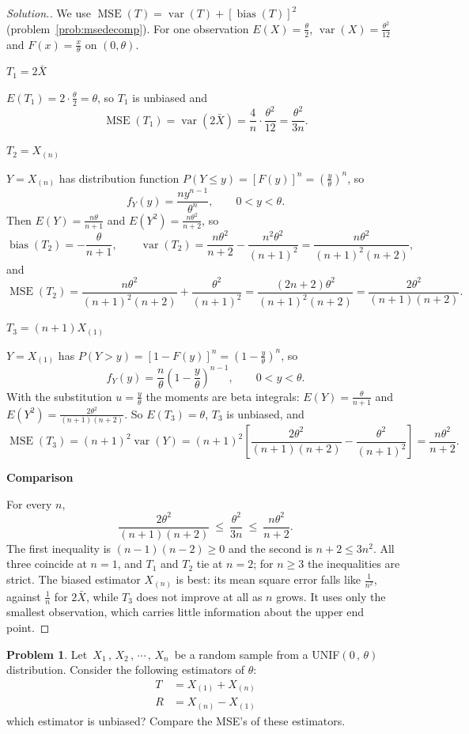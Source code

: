 \documentclass[12pt,a4paper]{report}
\theoremstyle{definition}
\newcommand{\subhead}[1]{%
  \par\medskip\noindent\textbf{#1}\par\nobreak\smallskip}
\DeclareMathOperator{\var}{var}
\DeclareMathOperator{\bias}{bias}
\DeclareMathOperator{\MSE}{MSE}
\newtheorem{problemx}{Problem}[section]
\newenvironment{problem}{\begin{problemx}}{\end{problemx}}
\newenvironment{solution}
  {\renewcommand{\qedsymbol}{}\begin{proof}[\textit{Solution}.]}
  {\end{proof}}
\begin{document}
\begin{solution}
We use $\MSE(T) = \var(T) + \left[\bias(T)\right]^2$ (problem~\ref{prob:msedecomp}).
For one observation $E(X) = \frac\theta2$, $\var(X) = \frac{\theta^2}{12}$ and
$F(x) = \frac x\theta$ on $(0, \theta)$.

\subhead{$T_1 = 2\bar X$}
$E(T_1) = 2\cdot\frac\theta2 = \theta$, so $T_1$ is unbiased and
\[\MSE(T_1) = \var(2\bar X) = \frac{4}{n}\cdot\frac{\theta^2}{12} = \frac{\theta^2}{3n} .\]

\subhead{$T_2 = X_{(n)}$}
$Y = X_{(n)}$ has distribution function $P(Y\le y) = \left[F(y)\right]^n =
\left(\frac y\theta\right)^n$, so
\[f_Y(y) = \frac{n y^{n-1}}{\theta^n},\qquad 0<y<\theta .\]
Then $E(Y) = \frac{n\theta}{n + 1}$ and $E(Y^2) = \frac{n\theta^2}{n + 2}$, so
\[\bias(T_2) = -\frac{\theta}{n + 1},\qquad
\var(T_2) = \frac{n\theta^2}{n + 2} - \frac{n^2\theta^2}{(n + 1)^2} = \frac{n\theta^2}{(n + 1)^2(n + 2)},\]
and
\[\MSE(T_2) = \frac{n\theta^2}{(n + 1)^2(n + 2)} + \frac{\theta^2}{(n + 1)^2}
= \frac{(2n + 2)\theta^2}{(n + 1)^2(n + 2)} = \frac{2\theta^2}{(n + 1)(n + 2)} .\]

\subhead{$T_3 = (n + 1)X_{(1)}$}
$Y = X_{(1)}$ has $P(Y>y) = \left[1 - F(y)\right]^n = \left(1 - \frac y\theta\right)^n$,
so
\[f_Y(y) = \frac n\theta\left(1 - \frac y\theta\right)^{n - 1},\qquad 0<y<\theta .\]
With the substitution $u = \frac y\theta$ the moments are beta integrals:
$E(Y) = \frac{\theta}{n + 1}$ and $E(Y^2) = \frac{2\theta^2}{(n + 1)(n + 2)}$. So
$E(T_3) = \theta$, $T_3$ is unbiased, and
\[\MSE(T_3) = (n + 1)^2\var(Y) = (n + 1)^2\left[\frac{2\theta^2}{(n + 1)(n + 2)} - \frac{\theta^2}{(n + 1)^2}\right]
= \frac{n\theta^2}{n + 2} .\]

\subhead{Comparison}
For every $n$,
\[\frac{2\theta^2}{(n + 1)(n + 2)}\ \le\ \frac{\theta^2}{3n}\ \le\ \frac{n\theta^2}{n + 2} .\]
The first inequality is $(n - 1)(n - 2)\ge 0$ and the second is $n + 2\le 3n^2$.
All three coincide at $n = 1$, and $T_1$ and $T_2$ tie at $n = 2$; for $n\ge 3$
the inequalities are strict. The biased estimator
$X_{(n)}$ is best: its mean square error falls like $\frac{1}{n^2}$, against
$\frac1n$ for $2\bar X$, while $T_3$ does not improve at all as $n$ grows. It uses
only the smallest observation, which carries little information about the upper
end point.
\end{solution}

\begin{problem}
Let $\, X_1\, , \, X_2\, , \, \cdots \, , \, X_n\,$ be a random sample from a UNIF$(0\, , \, \theta)$ distribution. Consider the following estimators of $\theta$:
\begin{align*}
T & = X_{(1)}  + X_{(n)}\\
R & = X_{(n)} - X_{(1)}
\end{align*}
which estimator is unbiased?
 Compare the MSE's of these estimators.
\end{problem}
\end{document}
